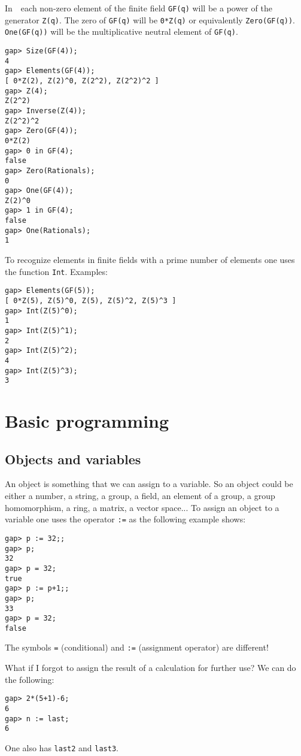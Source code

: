 In~\GAP~each non-zero element of the finite field
\lstinline{GF(q)} will be a power of the generator \lstinline{Z(q)}. The zero
of \lstinline{GF(q)} will be \lstinline{0*Z(q)} or equivalently
\lstinline{Zero(GF(q))}. \lstinline{One(GF(q))} will be the multiplicative
neutral element of \lstinline{GF(q)}. 
\begin{lstlisting}
gap> Size(GF(4));
4
gap> Elements(GF(4));
[ 0*Z(2), Z(2)^0, Z(2^2), Z(2^2)^2 ]
gap> Z(4);
Z(2^2)
gap> Inverse(Z(4));
Z(2^2)^2
gap> Zero(GF(4));
0*Z(2)
gap> 0 in GF(4);
false
gap> Zero(Rationals);
0
gap> One(GF(4));
Z(2)^0
gap> 1 in GF(4);
false
gap> One(Rationals);
1
\end{lstlisting}

To recognize elements in finite fields with a prime number of elements one uses
the function \lstinline{Int}. Examples:
\begin{lstlisting}
gap> Elements(GF(5));
[ 0*Z(5), Z(5)^0, Z(5), Z(5)^2, Z(5)^3 ]
gap> Int(Z(5)^0);
1
gap> Int(Z(5)^1);
2
gap> Int(Z(5)^2);
4
gap> Int(Z(5)^3);
3
\end{lstlisting}

\section{Basic programming}
\label{programming}

\subsection*{Objects and variables}

An object is something that we can assign to a variable. So an object could be
either a number, a string, a group, a field, an element of a group, a group
homomorphism, a ring, a matrix, a vector space... To assign an object to a
variable one uses the operator \lstinline{:=} as the following example shows:
\begin{lstlisting}
gap> p := 32;;
gap> p;
32
gap> p = 32;
true
gap> p := p+1;;
gap> p;
33
gap> p = 32;
false
\end{lstlisting}

\begin{remark}
  The symbols \lstinline{=} (conditional) and \lstinline{:=} (assignment
  operator) are different!
\end{remark}

\begin{remark}
What if I forgot to assign the result of a calculation for further use? We
can do the following:
\begin{lstlisting}
gap> 2*(5+1)-6;                                                       
6
gap> n := last;
6
\end{lstlisting}
One also has \lstinline{last2} and \lstinline{last3}. 
\end{remark}

